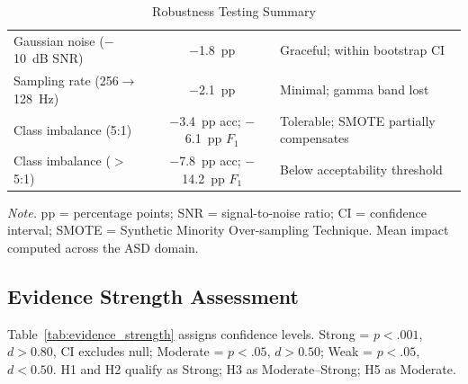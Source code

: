 \begin{table}[!htbp]
\tablestripes
\caption{Robustness Testing Summary}
\tablefontsize
\begin{tabularx}{\textwidth}{@{} L C L @{}}
\toprule
{} &  &  \\
\midrule
Gaussian noise ($-$10~dB SNR) & $-$1.8~pp & Graceful; within bootstrap CI \\
Sampling rate (256$\to$128~Hz) & $-$2.1~pp & Minimal; gamma band lost \\
Class imbalance (5:1) & $-$3.4~pp acc; $-$6.1~pp $F_1$ & Tolerable; SMOTE partially compensates \\
Class imbalance ($>$5:1) & $-$7.8~pp acc; $-$14.2~pp $F_1$ & Below acceptability threshold \\
\bottomrule
\end{tabularx}
\vspace{0.5em}\noindent\textit{Note.} pp = percentage points; SNR = signal-to-noise ratio; CI = confidence interval; SMOTE = Synthetic Minority Over-sampling Technique. Mean impact computed across the ASD domain.
\end{table}


\subsection{Evidence Strength Assessment}

Table~\ref{tab:evidence_strength} assigns confidence levels. Strong = $p < .001$, $d > 0.80$, CI excludes null; Moderate = $p < .05$, $d > 0.50$; Weak = $p < .05$, $d < 0.50$. H1 and H2 qualify as Strong; H3 as Moderate--Strong; H5 as Moderate.

